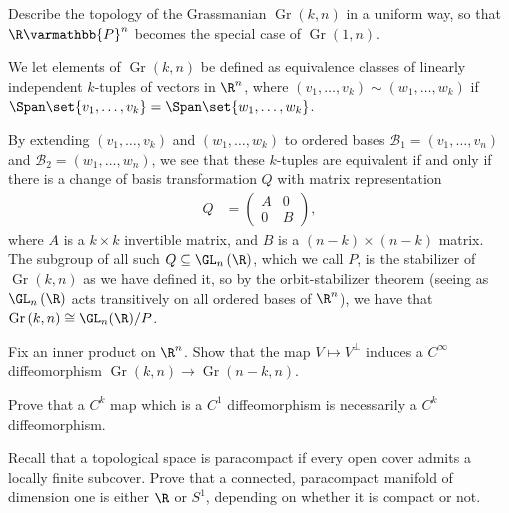 \documentclass[10pt]{mypackage}
\renewcommand*{\mathbb}[1]{\varmathbb{#1}}
\begin{document}
\RaggedRight
\begin{problem}[Problem 1]
  Describe the topology of the Grassmanian $\operatorname{Gr}\left( k,n \right)$ in a uniform way, so that $\R\mathbb{P}^n$ becomes the special case of $\operatorname{Gr}\left( 1,n \right)$.
\end{problem}
\begin{solution}
We let elements of $\operatorname{Gr}\left( k,n \right)$ be defined as equivalence classes of linearly independent $k$-tuples of vectors in $\R^n$, where $\left( v_1,\dots,v_k \right) \sim \left( w_1,\dots,w_k \right)$ if $\Span \set{v_1,\dots,v_k} = \Span\set{w_1,\dots,w_k} $.\newline

By extending $\left( v_1,\dots,v_k \right)$ and $\left( w_1,\dots,w_k \right)$ to ordered bases $\mathcal{B}_1 = \left( v_1,\dots,v_n \right)$ and $\mathcal{B}_2 = \left( w_1,\dots,w_n \right)$, we see that these $k$-tuples are equivalent if and only if there is a change of basis transformation $Q$ with matrix representation
\begin{align*}
  Q &= \begin{pmatrix}A & 0 \\ 0 & B\end{pmatrix},
\end{align*}
where $A$ is a $k\times k$ invertible matrix, and $B$ is a $\left( n-k \right)\times \left( n-k \right)$ matrix. The subgroup of all such $Q\subseteq \GL_n\left( \R \right)$, which we call $P$, is the stabilizer of $\operatorname{Gr}\left( k,n \right)$ as we have defined it, so by the orbit-stabilizer theorem (seeing as $\GL_n\left( \R \right)$ acts transitively on all ordered bases of $\R^n$), we have that $\operatorname{Gr}\left( k,n \right) \cong \GL_n(\R)/P$.
\end{solution}
\begin{problem}[Problem 2]
  Fix an inner product on $\R^n$. Show that the map $V\mapsto V^{\perp}$ induces a $C^{\infty}$ diffeomorphism $\operatorname{Gr}\left( k,n \right)\rightarrow \operatorname{Gr}\left( n-k,n \right)$.
\end{problem}
\begin{problem}[Problem 3]
  Prove that a $C^{k}$ map which is a $C^{1}$ diffeomorphism is necessarily a $C^{k}$ diffeomorphism.
\end{problem}
\begin{problem}[Problem 4]
  Recall that a topological space is paracompact if every open cover admits a locally finite subcover. Prove that a connected, paracompact manifold of dimension one is either $\R$ or $S^{1}$, depending on whether it is compact or not.
\end{problem}
\end{document}
